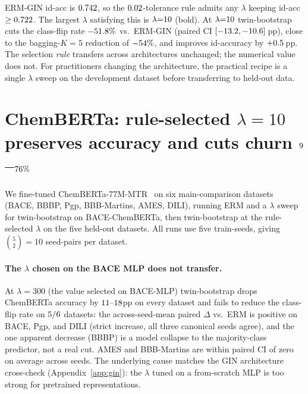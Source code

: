

ERM-GIN id-acc is $0.742$, so the $0.02$-tolerance
rule admits any $\lambda$ keeping id-acc $\geq 0.722$.  The largest $\lambda$
satisfying this is $\lambda{=}10$ (bold).  At
$\lambda{=}10$ twin-bootstrap cuts the class-flip rate
$-51.8\%$ vs.\ ERM-GIN (paired CI
$[-13.2, -10.6]$\,pp), close to the
bagging-$K{=}5$ reduction of $-54\%$, and
improves id-accuracy by $+0.5$\,pp.  The selection
\emph{rule} transfers across architectures unchanged; the numerical
value does not.  For practitioners changing the architecture, the
practical recipe is a single $\lambda$ sweep on the development
dataset before transferring to held-out data.

\section{\boldmath ChemBERTa: rule-selected $\lambda{=}10$ preserves accuracy and cuts churn $9$--$76\%$}
\label{app:chemberta_scope}

We fine-tuned
ChemBERTa-77M-MTR~\citep{chithrananda2020chemberta0} on six
main-comparison datasets (BACE, BBBP, Pgp, BBB-Martins, AMES, DILI), running
ERM and a $\lambda$ sweep for twin-bootstrap on BACE-ChemBERTa, then
twin-bootstrap at the rule-selected $\lambda$ on the five held-out
datasets.  All runs use five train-seeds, giving
$\binom{5}{2}=10$ seed-pairs per dataset.

\paragraph{\boldmath The $\lambda$ chosen on the BACE MLP does not transfer.}  At
$\lambda{=}300$ (the value selected on BACE-MLP) twin-bootstrap drops
ChemBERTa accuracy by
$11\text{--}18$pp on every
dataset and fails to reduce the class-flip rate on
$5/6$
datasets: the across-seed-mean paired $\Delta$ vs.\ ERM is positive
on BACE, Pgp, and DILI (strict increase, all three canonical seeds
agree), and the one apparent decrease (BBBP) is a model collapse to
the majority-class predictor, not a real cut.  AMES and BBB-Martins
are within paired CI of zero on average across seeds.  The
underlying cause matches the GIN architecture cross-check
(Appendix~\ref{app:gin}): the $\lambda$ tuned on a from-scratch MLP
is too strong for pretrained representations.

